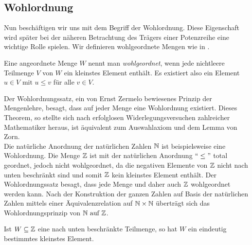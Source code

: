 \subsection{Wohlordnung}
Nun beschäftigen wir uns mit dem Begriff der Wohlordnung. Diese Eigenschaft wird später bei der näheren Betrachtung des Trägers einer Potenzreihe eine wichtige Rolle spielen. Wir definieren wohlgeordnete Mengen wie in \cite[S. 16]{fuchs66}.
\begin{defn} \label{wohlgeordn} %
Eine angeordnete Menge $W$ nennt man \textit{wohlgeordnet}, wenn jede nichtleere Teilmenge $V$ von $W$ ein kleinstes Element enthält. Es existiert also ein Element $ u \in V \text{ mit } u \le v $ für alle $ v \in V.$ 
\end{defn}
%
Der Wohlordnungssatz, ein von Ernst Zermelo bewiesenes Prinzip der Mengenlehre, besagt, dass auf jeder Menge eine Wohlordnung existiert. Dieses Theorem, so stellte sich nach erfolglosen Widerlegungsversuchen zahlreicher Mathematiker heraus, ist äquivalent zum Auswahlaxiom und dem Lemma von Zorn. \\
Die natürliche Anordnung der natürlichen Zahlen $\mathbb{N}$ ist beispielsweise eine Wohlordnung. Die Menge $\mathbb{Z}$ ist mit der natürlichen Anordnung $``\leq "$ total geordnet, jedoch nicht wohlgeordnet, da die negativen Elemente von $\mathbb{Z}$ nicht nach unten beschränkt sind und somit $\mathbb{Z}$ kein kleinstes Element enthält. Der Wohlordnungssatz besagt, dass jede Menge und daher auch $\mathbb{Z}$ wohlgeordnet werden kann. Nach der Konstruktion der ganzen Zahlen auf Basis der natürlichen Zahlen mittels einer Äquivalenzrelation auf $\mathbb{N} \times \mathbb{N}$  überträgt sich das Wohlordnungsprinzip von $\mathbb{N} \text{ auf } \mathbb{Z}$.
\begin{bem} \label{teilmengeGanzeZahlenwohlgeordnet}%
Ist $W \subseteq \mathbb{Z}$ eine nach unten beschränkte Teilmenge, so hat $W$ ein eindeutig bestimmtes kleinstes Element. 
\end{bem} 

